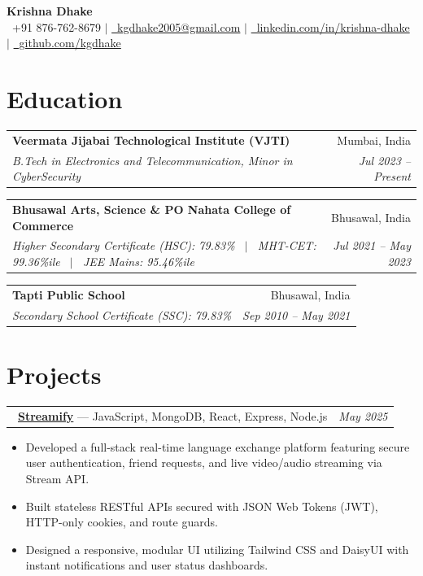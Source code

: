 \documentclass[a4paper,10pt]{article}
\makeatletter
\newcommand{\resumeSubheading}[4]{
  \begin{tabular*}{\textwidth}[t]{l@{\extracolsep{\fill}}r}
    \textbf{#1} & #2 \\
    \textit{\small#3} & \textit{\small #4} \\
  \end{tabular*}
}
\newcommand{\resumeProjectHeading}[2]{
  \begin{tabular*}{\textwidth}[t]{l@{\extracolsep{\fill}}r}
    #1 & \textit{\small #2} \\
  \end{tabular*}
}
\newcommand{\entryGap}{\vspace{2.5pt}}
\makeatother
\begin{document}
\begin{center}
    {\LARGE \textbf{Krishna Dhake}} \\[2pt]
    \small
    \faPhone\ +91 876-762-8679 \quad $|$ \quad
    \href{mailto:kgdhake2005@gmail.com}{\faEnvelope\ kgdhake2005@gmail.com} \quad $|$ \quad
    \href{https://linkedin.com/in/krishna-dhake}{\faLinkedin\ linkedin.com/in/krishna-dhake} \quad $|$ \quad
    \href{https://github.com/kgdhake}{\faGithub\ github.com/kgdhake}
\end{center}

\section{Education}

\resumeSubheading
  {Veermata Jijabai Technological Institute (VJTI)}{Mumbai, India}
  {B.Tech in Electronics and Telecommunication, Minor in CyberSecurity}{Jul 2023 -- Present}

\entryGap
\resumeSubheading
  {Bhusawal Arts, Science \& PO Nahata College of Commerce}{Bhusawal, India}
  {Higher Secondary Certificate (HSC): 79.83\% \ $|$ \ MHT-CET: 99.36\%ile \ $|$ \ JEE Mains: 95.46\%ile}{Jul 2021 -- May 2023}

\entryGap
\resumeSubheading
  {Tapti Public School}{Bhusawal, India}
  {Secondary School Certificate (SSC): 79.83\%}{Sep 2010 -- May 2021}

\section{Projects}

\resumeProjectHeading
  {\href{https://github.com/kgdhake/Video-Streaming-App}{\faGithub} \ \textbf{\href{https://videostreamingapp-olive.vercel.app/login}{Streamify}} --- JavaScript, MongoDB, React, Express, Node.js}{May 2025}
\begin{itemize}
    \item Developed a full-stack real-time language exchange platform featuring secure user authentication, friend requests, and live video/audio streaming via Stream API.
    \item Built stateless RESTful APIs secured with JSON Web Tokens (JWT), HTTP-only cookies, and route guards.
    \item Designed a responsive, modular UI utilizing Tailwind CSS and DaisyUI with instant notifications and user status dashboards.
\end{itemize}
\end{document}
